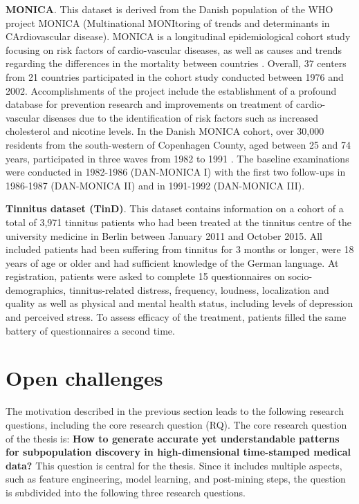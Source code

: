 \documentclass[
]{book}
\begin{document}
\textbf{MONICA}. This dataset is derived from the Danish population of the WHO project MONICA (Multinational MONItoring of trends and determinants in CArdiovascular disease).
MONICA is a longitudinal epidemiological cohort study focusing on risk factors of cardio-vascular diseases, as well as causes and trends regarding the differences in the mortality between countries \autocite{WHO:MONICA1989}.
Overall, 37 centers from 21 countries participated in the cohort study conducted between 1976 and 2002.
Accomplishments of the project include the establishment of a profound database for prevention research and improvements on treatment of cardio-vascular diseases due to the identification of risk factors such as increased cholesterol and nicotine levels.
In the Danish MONICA cohort, over 30,000 residents from the south-western of Copenhagen County, aged between 25 and 74 years, participated in three waves from 1982 to 1991 \autocite{Bronnum:DanMONICA2001}.
The baseline examinations were conducted in 1982-1986 (DAN-MONICA I) with the first two follow-ups in 1986-1987 (DAN-MONICA II) and in 1991-1992 (DAN-MONICA III).

\textbf{Tinnitus dataset (TinD)}. This dataset contains information on a cohort of a total of 3,971 tinnitus patients who had been treated at the tinnitus centre of the university medicine in Berlin between January 2011 and October 2015. All included patients had been suffering from tinnitus for 3 months or longer, were 18 years of age or older and had sufficient knowledge of the German language.
At registration, patients were asked to complete 15 questionnaires on socio-demographics, tinnitus-related distress, frequency, loudness, localization and quality as well as physical and mental health status, including levels of depression and perceived stress.
To assess efficacy of the treatment, patients filled the same battery of questionnaires a second time.

\hypertarget{open-challenges}{%
\section{Open challenges}\label{open-challenges}}

The motivation described in the previous section leads to the following research questions, including the core research question (RQ). The core research question of the thesis is: \textbf{How to generate accurate yet understandable patterns for subpopulation discovery in high-dimensional time-stamped medical data?}
This question is central for the thesis. Since it includes multiple aspects, such as feature engineering, model learning, and post-mining steps, the question is subdivided into the following three research questions.
\end{document}
